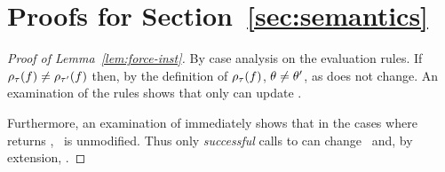 \section{Proofs for Section~\ref{sec:semantics}}
\label{sec:proofs}

\begin{proof}[Proof of Lemma~\ref{lem:force-inst}]
  By case analysis on the evaluation rules.
  If $\rho_{\tau}(f) \neq \rho_{\tau'}(f)$ then,
  by the definition of $\rho_{\tau}(f)$, $\theta \neq \theta'$, as \thole
  does not change.
  An examination of the rules shows that only \forcesym can update \tsu.


  Furthermore, an examination of \forcesym immediately shows that in the
  cases where \forcesym returns \stuck, \tsu\ is unmodified. Thus only
  \emph{successful} calls to \forcesym can change \tsu\ and, by
  extension, .





\end{proof}
